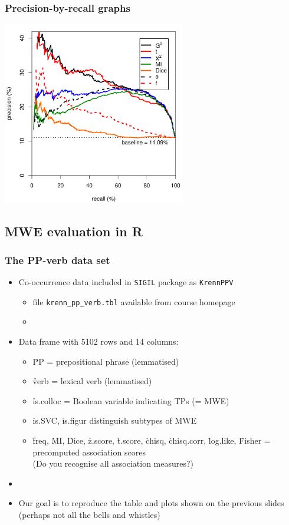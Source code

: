 \documentclass[t]{beamer} %
\begin{document}
\begin{frame}
  \frametitle{Precision-by-recall graphs}

  \begin{center}
    \includegraphics[width=8cm]{img/mwe_eval_3}
  \end{center}
\end{frame}

\subsection{MWE evaluation in R}

\begin{frame}[fragile]
  \frametitle{The PP-verb data set}

  \begin{itemize}
    \item Co-occurrence data included in \texttt{SIGIL} package as \texttt{KrennPPV}
    \begin{itemize}
    \item file \verb|krenn_pp_verb.tbl| available from course homepage
    \item[]
    \end{itemize}
  \item Data frame with 5102 rows and 14 columns:
    \begin{itemize}
    \item \h{PP} = prepositional phrase (lemmatised)
    \item \h{verb} = lexical verb (lemmatised)
    \item \h{is.colloc} = Boolean variable indicating TPs (= MWE)
    \item \h{is.SVC}, \h{is.figur} distinguish subtypes of MWE
    \item \h{freq}, \h{MI}, \h{Dice}, \h{z.score}, \h{t.score}, \h{chisq},
      \h{chisq.corr}, \h{log.like}, \h{Fisher} = precomputed association
      scores\\ (Do you recognise all association measures?)
    \end{itemize}
  \item[]
  \item Our goal is to reproduce the table and plots shown on the previous
    slides (perhaps not all the bells and whistles)
  \end{itemize}
\end{frame}
\end{document}
